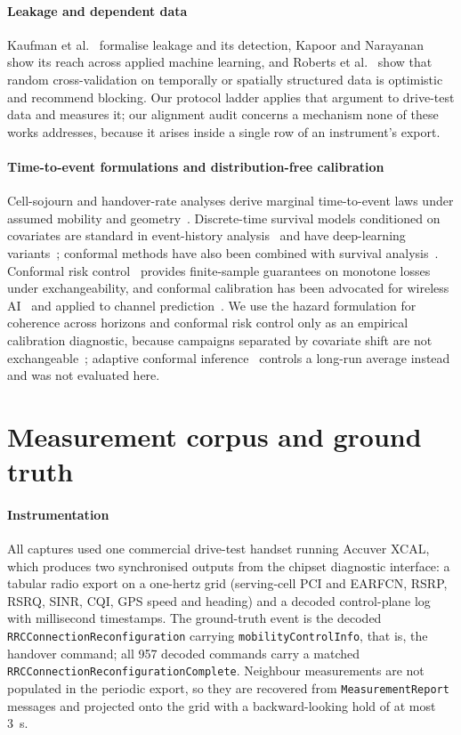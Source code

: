 \documentclass[preprint,review,12pt]{elsarticle}\usepackage{lineno}\linenumbers
\begin{document}
\paragraph{Leakage and dependent data} Kaufman et al.~\cite{ref36} formalise leakage and its detection, Kapoor and Narayanan~\cite{ref56} show its reach across applied machine learning, and Roberts et al.~\cite{ref35} show that random cross-validation on temporally or spatially structured data is optimistic and recommend blocking. Our protocol ladder applies that argument to drive-test data and measures it; our alignment audit concerns a mechanism none of these works addresses, because it arises inside a single row of an instrument's export.

\paragraph{Time-to-event formulations and distribution-free calibration} Cell-sojourn and handover-rate analyses derive marginal time-to-event laws under assumed mobility and geometry~\cite{ref42,ref43,ref44}. Discrete-time survival models conditioned on covariates are standard in event-history analysis~\cite{ref48,ref49,ref50} and have deep-learning variants~\cite{ref16,ref17}; conformal methods have also been combined with survival analysis~\cite{ref18}. Conformal risk control~\cite{ref21,ref22} provides finite-sample guarantees on monotone losses under exchangeability, and conformal calibration has been advocated for wireless AI~\cite{ref19,ref20} and applied to channel prediction~\cite{ref55}. We use the hazard formulation for coherence across horizons and conformal risk control only as an empirical calibration diagnostic, because campaigns separated by covariate shift are not exchangeable~\cite{ref51,ref52}; adaptive conformal inference~\cite{ref53} controls a long-run average instead and was not evaluated here.

\section{Measurement corpus and ground truth}
\label{sec:corpus}

\paragraph{Instrumentation} All captures used one commercial drive-test handset running Accuver XCAL, which produces two synchronised outputs from the chipset diagnostic interface: a tabular radio export on a one-hertz grid (serving-cell PCI and EARFCN, RSRP, RSRQ, SINR, CQI, GPS speed and heading) and a decoded control-plane log with millisecond timestamps. The ground-truth event is the decoded \texttt{RRCConnectionReconfiguration} carrying \texttt{mobilityControlInfo}, that is, the handover command; all 957 decoded commands carry a matched \texttt{RRCConnectionReconfigurationComplete}. Neighbour measurements are not populated in the periodic export, so they are recovered from \texttt{MeasurementReport} messages and projected onto the grid with a backward-looking hold of at most 3~s.
\end{document}
